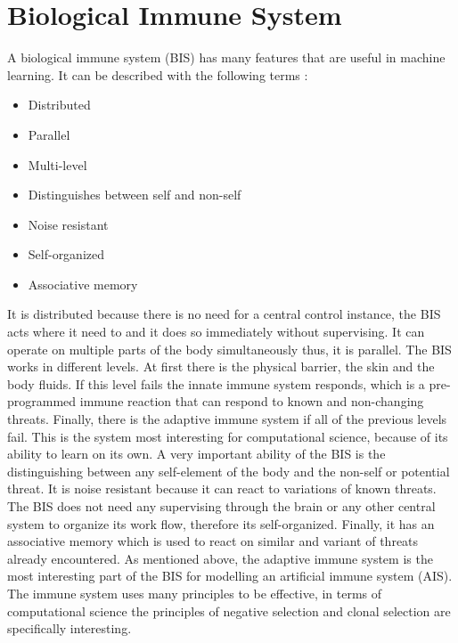 %
%
% 
% 
% 


\chapter{Biological Immune System}
\label{chap:bis}

\nocite{DEC02}
\nocite{NAN08}
\nocite{PAM17}
\nocite{RIFF09}

A biological immune system (BIS) has many features that are useful in machine learning. It can be described with the following terms \cite{tan2016artificial}:
\begin{itemize}
	\item 	Distributed
	\item 	Parallel
	\item 	Multi-level
	\item 	Distinguishes between self and non-self
	\item 	Noise resistant
	\item 	Self-organized
	\item 	Associative memory
	
\end{itemize}
It is distributed because there is no need for a central control instance, the BIS acts where it need to and it does so immediately without supervising. It can operate on multiple parts of the body simultaneously thus, it is parallel. The BIS works in different levels. At first there is the physical barrier, the skin and the body fluids. If this level fails the innate immune system responds, which is a pre-programmed immune reaction that can respond to known and non-changing threats. Finally, there is the adaptive immune system if all of the previous levels fail. This is the system most interesting for computational science, because of its ability to learn on its own. A very important ability of the BIS is the distinguishing between any self-element of the body and the non-self or potential threat. It is noise resistant because it can react to variations of known threats. The BIS does not need any supervising through the brain or any other central system to organize its work flow, therefore its self-organized. Finally, it has an associative memory which is used to react on similar and variant of threats already encountered.
As mentioned above, the adaptive immune system is the most interesting part of the BIS for modelling an artificial immune system (AIS). The immune system uses many principles to be effective, in terms of computational science the principles of negative selection and clonal selection are specifically interesting.

